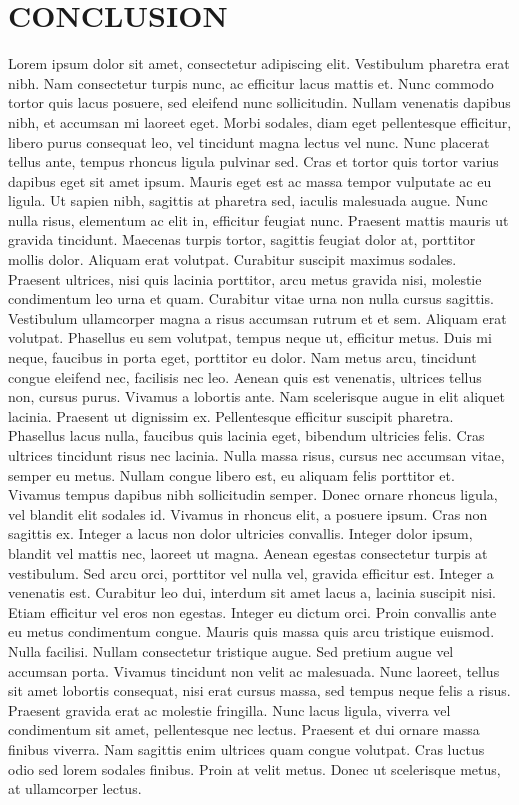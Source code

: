 \documentclass[a4paper]{memoir}
\begin{document}
\chapter{CONCLUSION}
\label{conclusion}

Lorem ipsum dolor sit amet, consectetur adipiscing elit. Vestibulum pharetra erat nibh. Nam consectetur turpis nunc, ac efficitur lacus mattis et. Nunc commodo tortor quis lacus posuere, sed eleifend nunc sollicitudin. Nullam venenatis dapibus nibh, et accumsan mi laoreet eget. Morbi sodales, diam eget pellentesque efficitur, libero purus consequat leo, vel tincidunt magna lectus vel nunc. Nunc placerat tellus ante, tempus rhoncus ligula pulvinar sed. Cras et tortor quis tortor varius dapibus eget sit amet ipsum. Mauris eget est ac massa tempor vulputate ac eu ligula.
Ut sapien nibh, sagittis at pharetra sed, iaculis malesuada augue. Nunc nulla risus, elementum ac elit in, efficitur feugiat nunc. Praesent mattis mauris ut gravida tincidunt. Maecenas turpis tortor, sagittis feugiat dolor at, porttitor mollis dolor. Aliquam erat volutpat. Curabitur suscipit maximus sodales. Praesent ultrices, nisi quis lacinia porttitor, arcu metus gravida nisi, molestie condimentum leo urna et quam.
Curabitur vitae urna non nulla cursus sagittis. Vestibulum ullamcorper magna a risus accumsan rutrum et et sem. Aliquam erat volutpat. Phasellus eu sem volutpat, tempus neque ut, efficitur metus. Duis mi neque, faucibus in porta eget, porttitor eu dolor. Nam metus arcu, tincidunt congue eleifend nec, facilisis nec leo. Aenean quis est venenatis, ultrices tellus non, cursus purus. Vivamus a lobortis ante. Nam scelerisque augue in elit aliquet lacinia. Praesent ut dignissim ex. Pellentesque efficitur suscipit pharetra. Phasellus lacus nulla, faucibus quis lacinia eget, bibendum ultricies felis. Cras ultrices tincidunt risus nec lacinia. Nulla massa risus, cursus nec accumsan vitae, semper eu metus. Nullam congue libero est, eu aliquam felis porttitor et. Vivamus tempus dapibus nibh sollicitudin semper.
Donec ornare rhoncus ligula, vel blandit elit sodales id. Vivamus in rhoncus elit, a posuere ipsum. Cras non sagittis ex. Integer a lacus non dolor ultricies convallis. Integer dolor ipsum, blandit vel mattis nec, laoreet ut magna. Aenean egestas consectetur turpis at vestibulum. Sed arcu orci, porttitor vel nulla vel, gravida efficitur est. Integer a venenatis est. Curabitur leo dui, interdum sit amet lacus a, lacinia suscipit nisi. Etiam efficitur vel eros non egestas. Integer eu dictum orci. Proin convallis ante eu metus condimentum congue. Mauris quis massa quis arcu tristique euismod. Nulla facilisi. Nullam consectetur tristique augue.
Sed pretium augue vel accumsan porta. Vivamus tincidunt non velit ac malesuada. Nunc laoreet, tellus sit amet lobortis consequat, nisi erat cursus massa, sed tempus neque felis a risus. Praesent gravida erat ac molestie fringilla. Nunc lacus ligula, viverra vel condimentum sit amet, pellentesque nec lectus. Praesent et dui ornare massa finibus viverra. Nam sagittis enim ultrices quam congue volutpat. Cras luctus odio sed lorem sodales finibus. Proin at velit metus. Donec ut scelerisque metus, at ullamcorper lectus. 
\end{document}
